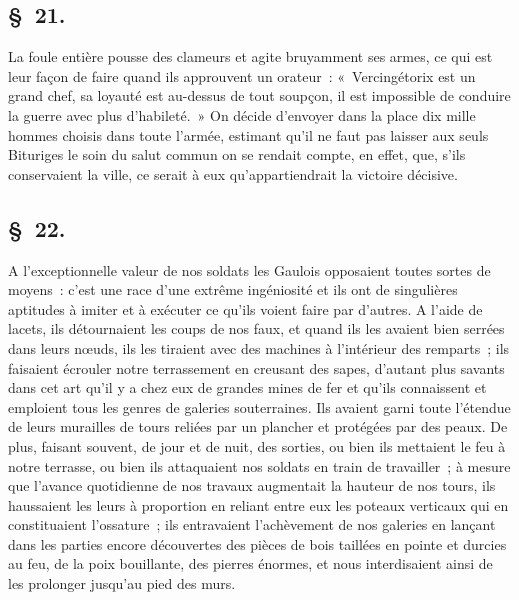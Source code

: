 \documentclass[french,twoside]{book} %
\begin{document}
\subsection[{§ 21.}]{ \textsc{§ 21.} }
\noindent La foule entière pousse des clameurs et agite bruyamment ses armes, ce qui est leur façon de faire quand ils approuvent un orateur : « Vercingétorix est un grand chef, sa loyauté est au-dessus de tout soupçon, il est impossible de conduire la guerre avec plus d’habileté. » On décide d’envoyer dans la place dix mille hommes choisis dans toute l’armée, estimant qu’il ne faut pas laisser aux seuls Bituriges le soin du salut commun on se rendait compte, en effet, que, s’ils conservaient la ville, ce serait à eux qu’appartiendrait la victoire décisive.
\subsection[{§ 22.}]{ \textsc{§ 22.} }
\noindent A l’exceptionnelle valeur de nos soldats les Gaulois opposaient toutes sortes de moyens : c’est une race d’une extrême ingéniosité et ils ont de singulières aptitudes à imiter et à exécuter ce qu’ils voient faire par d’autres. A l’aide de lacets, ils détournaient les coups de nos faux, et quand ils les avaient bien serrées dans leurs nœuds, ils les tiraient avec des machines à l’intérieur des remparts ; ils faisaient écrouler notre terrassement en creusant des sapes, d’autant plus savants dans cet art qu’il y a chez eux de grandes mines de fer et qu’ils connaissent et emploient tous les genres de galeries souterraines. Ils avaient garni toute l’étendue de leurs murailles de tours reliées par un plancher et protégées par des peaux. De plus, faisant souvent, de jour et de nuit, des sorties, ou bien ils mettaient le feu à notre terrasse, ou bien ils attaquaient nos soldats en train de travailler ; à mesure que l’avance quotidienne de nos travaux augmentait la hauteur de nos tours, ils haussaient les leurs à proportion en reliant entre eux les poteaux verticaux qui en constituaient l’ossature ; ils entravaient l’achèvement de nos galeries en lançant dans les parties encore découvertes des pièces de bois taillées en pointe et durcies au feu, de la poix bouillante, des pierres énormes, et nous interdisaient ainsi de les prolonger jusqu’au pied des murs.
\end{document}

